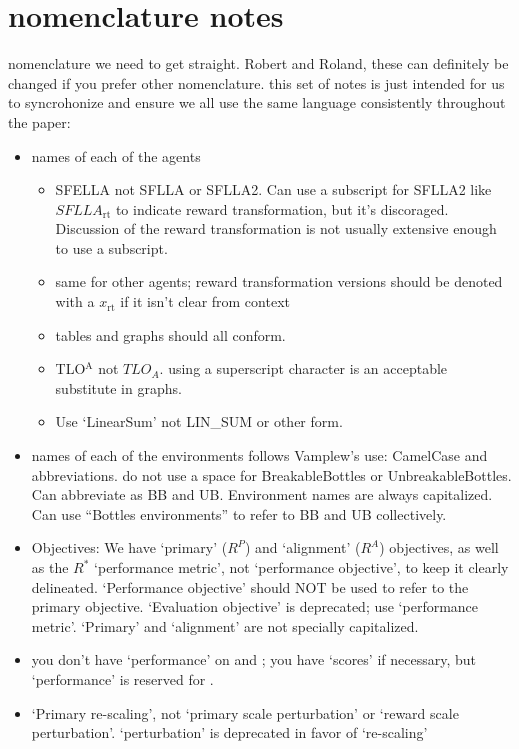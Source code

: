 \section*{nomenclature notes}
nomenclature we need to get straight. Robert and Roland, these can definitely be changed if you prefer other nomenclature. this set of notes is just intended for us to syncrohonize and ensure we all use the same language consistently throughout the paper:

\begin{itemize}
    \item names of each of the agents
        \begin{itemize}
            \item SFELLA not SFLLA or SFLLA2. Can use a subscript for SFLLA2 like $SFLLA_{\text{rt}}$ to indicate reward transformation, but it's discoraged. Discussion of the reward transformation is not usually extensive enough to use a subscript. 
            \item same for other agents; reward transformation versions should be denoted with a $x_{\text{rt}}$ if it isn't clear from context
            \item tables and graphs should all conform.
            \item TLO$^\text{A}$ not $TLO_A$. using a superscript character is an acceptable substitute in graphs.
            \item Use `LinearSum' not LIN\_SUM or other form.
        \end{itemize}
    \item names of each of the environments follows Vamplew's use: CamelCase and abbreviations. do not use a space for BreakableBottles or UnbreakableBottles. Can abbreviate as BB and UB. Environment names are always capitalized. Can use ``Bottles environments'' to refer to BB and UB collectively.
    \item Objectives: We have `primary' ($R^P$) and `alignment' ($R^A$) objectives, as well as the $R^*$ `performance metric', not `performance objective', to keep it clearly delineated. `Performance objective' should NOT be used to refer to the primary objective. `Evaluation objective' is deprecated; use `performance metric'. `Primary' and `alignment' are not specially capitalized.
    \item you don't have `performance' on \RA{} and \RP{}; you have `scores' if necessary, but `performance' is reserved for \RStar{}.
    \item `Primary re-scaling', not `primary scale perturbation' or `reward scale perturbation'. `perturbation' is deprecated in favor of `re-scaling'

\end{itemize}
